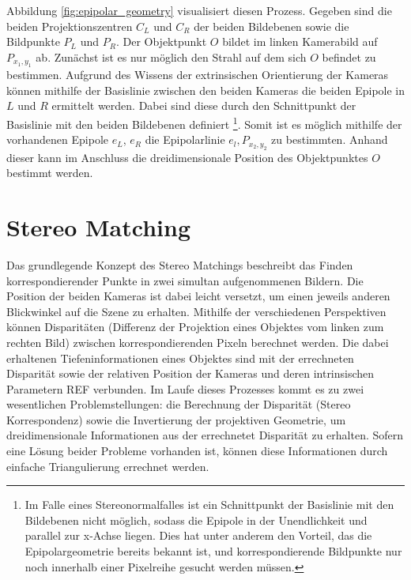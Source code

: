 Abbildung \ref{fig:epipolar_geometry} visualisiert diesen Prozess. Gegeben sind die beiden Projektionszentren $C_L$ und $C_R$ der beiden Bildebenen sowie die Bildpunkte $P_L$ und $P_R$. Der Objektpunkt $O$ bildet im linken Kamerabild auf $P_{x_1,y_1}$ ab. Zunächst ist es nur möglich den Strahl auf dem sich $O$ befindet zu bestimmen. Aufgrund des Wissens der extrinsischen Orientierung der Kameras können mithilfe der Basislinie zwischen den beiden Kameras die beiden Epipole in $L$ und $R$ ermittelt werden. Dabei sind diese durch den Schnittpunkt der Basislinie mit den beiden Bildebenen definiert \footnote{Im Falle eines Stereonormalfalles ist ein Schnittpunkt der Basislinie mit den Bildebenen nicht möglich, sodass die Epipole in der Unendlichkeit und parallel zur x-Achse liegen. Dies hat unter anderem den Vorteil, das die Epipolargeometrie bereits bekannt ist, und korrespondierende Bildpunkte nur noch innerhalb einer Pixelreihe gesucht werden müssen.}. Somit ist es möglich mithilfe der vorhandenen Epipole $e_L$, $e_R$ die Epipolarlinie $e_l,P_{x_2,y_2}$ zu bestimmten. Anhand dieser kann im Anschluss die dreidimensionale Position des Objektpunktes $O$ bestimmt werden.

\section{Stereo Matching}
\label{sec:stereo_matching}
Das grundlegende Konzept des Stereo Matchings beschreibt das Finden korrespondierender Punkte in zwei simultan aufgenommenen Bildern. Die Position der beiden Kameras ist dabei leicht versetzt, um einen jeweils anderen Blickwinkel auf die Szene zu erhalten. Mithilfe der verschiedenen Perspektiven können Disparitäten (Differenz der Projektion eines Objektes vom linken zum rechten Bild) zwischen korrespondierenden Pixeln berechnet werden. Die dabei erhaltenen Tiefeninformationen eines Objektes sind mit der errechneten Disparität sowie der relativen Position der Kameras und deren intrinsischen Parametern REF verbunden.
Im Laufe dieses Prozesses kommt es zu zwei wesentlichen Problemstellungen: die Berechnung der Disparität (Stereo Korrespondenz) sowie die Invertierung der projektiven Geometrie, um dreidimensionale Informationen aus der errechnetet Disparität zu erhalten. Sofern eine Lösung beider Probleme vorhanden ist, können diese Informationen durch einfache Triangulierung errechnet werden.



